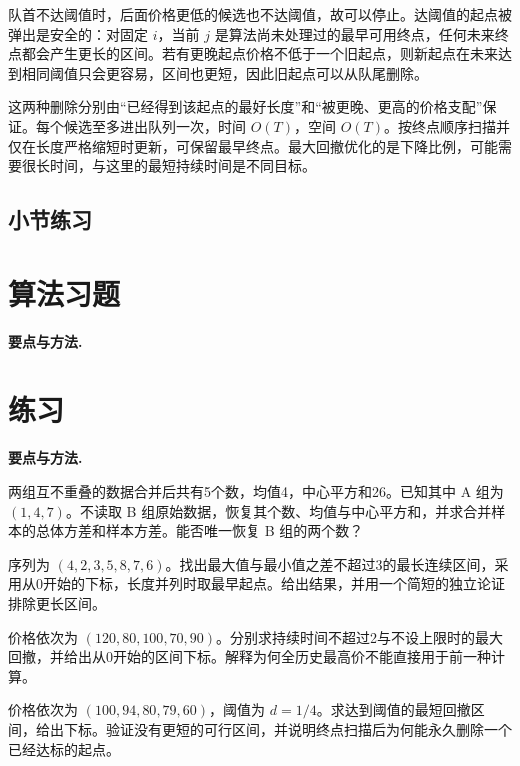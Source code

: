 队首不达阈值时，后面价格更低的候选也不达阈值，故可以停止。达阈值的起点被弹出是安全的：对固定 $i$，当前 $j$ 是算法尚未处理过的最早可用终点，任何未来终点都会产生更长的区间。若有更晚起点价格不低于一个旧起点，则新起点在未来达到相同阈值只会更容易，区间也更短，因此旧起点可以从队尾删除。

这两种删除分别由“已经得到该起点的最好长度”和“被更晚、更高的价格支配”保证。每个候选至多进出队列一次，时间 $O(T)$，空间 $O(T)$。按终点顺序扫描并仅在长度严格缩短时更新，可保留最早终点。最大回撤优化的是下降比例，可能需要很长时间，与这里的最短持续时间是不同目标。

\par{}
\subsection*{小节练习}


\section{算法习题}
\noindent\textbf{要点与方法.}\enspace





\section{练习}
\noindent\textbf{要点与方法.}\enspace


两组互不重叠的数据合并后共有5个数，均值4，中心平方和26。已知其中 A 组为 $(1,4,7)$。不读取 B 组原始数据，恢复其个数、均值与中心平方和，并求合并样本的总体方差和样本方差。能否唯一恢复 B 组的两个数？

序列为 $(4,2,3,5,8,7,6)$。找出最大值与最小值之差不超过3的最长连续区间，采用从0开始的下标，长度并列时取最早起点。给出结果，并用一个简短的独立论证排除更长区间。

价格依次为 $(120,80,100,70,90)$。分别求持续时间不超过2与不设上限时的最大回撤，并给出从0开始的区间下标。解释为何全历史最高价不能直接用于前一种计算。

价格依次为 $(100,94,80,79,60)$，阈值为 $d=1/4$。求达到阈值的最短回撤区间，给出下标。验证没有更短的可行区间，并说明终点扫描后为何能永久删除一个已经达标的起点。
